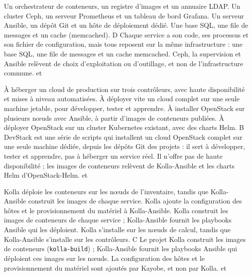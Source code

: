 
  {Un orchestrateur de conteneurs, un registre d'images et un annuaire LDAP.}
  {Un cluster Ceph, un serveur Prometheus et un tableau de bord Grafana.}
  {Un serveur Ansible, un dépôt Git et un hôte de déploiement dédié.}
  {Une base SQL, une file de messages et un cache (memcached).}
  {D}
  {Chaque service a son code, ses processus et son fichier de configuration, mais tous reposent sur la même infrastructure : une base SQL, une file de messages et un cache memcached. Ceph, la supervision et Ansible relèvent de choix d'exploitation ou d'outillage, et non de l'infrastructure commune.}
  { et }

  {À héberger un cloud de production sur trois contrôleurs, avec haute disponibilité et mises à niveau automatisées.}
  {À déployer vite un cloud complet sur une seule machine jetable, pour développer, tester et apprendre.}
  {À installer OpenStack sur plusieurs nœuds avec Ansible, à partir d'images de conteneurs publiées.}
  {À déployer OpenStack sur un cluster Kubernetes existant, avec des charts Helm.}
  {B}
  {DevStack est une série de scripts qui installent un cloud OpenStack complet sur une seule machine dédiée, depuis les dépôts Git des projets : il sert à développer, tester et apprendre, pas à héberger un service réel. Il n'offre pas de haute disponibilité ; les images de conteneurs relèvent de Kolla-Ansible et les charts Helm d'OpenStack-Helm.}
  { et }

  {Kolla déploie les conteneurs sur les nœuds de l'inventaire, tandis que Kolla-Ansible construit les images de chaque service.}
  {Kolla ajoute la configuration des hôtes et le provisionnement du matériel à Kolla-Ansible.}
  {Kolla construit les images de conteneurs de chaque service ; Kolla-Ansible fournit les playbooks Ansible qui les déploient.}
  {Kolla s'installe sur les nœuds de calcul, tandis que Kolla-Ansible s'installe sur les contrôleurs.}
  {C}
  {Le projet Kolla construit les images de conteneurs (\texttt{kolla-build}) ; Kolla-Ansible fournit les playbooks Ansible qui déploient ces images sur les nœuds. La configuration des hôtes et le provisionnement du matériel sont ajoutés par Kayobe, et non par Kolla.}
  { et }

